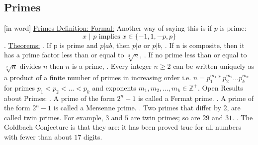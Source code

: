 \documentclass{article}
\begin{document}
\subsection{Primes}
[in word]
\newline
\newline
\underline{Primes Definition: Formal:}
Another way of saying this is if $p$ is prime:
$$x \text{ | } p	\text{ implies }	x \in \{ -1,1,-p,p \}$$.
\newline
\newline
\underline{Theorems:}
\newline
{}. If p is prime and $p | ab$, then $p | a$ or $p | b$,
. If n is composite, then it has a prime factor less than or equal to $\sqrt[2]{n}$,
. If no prime less than or equal to $\sqrt[2]{n}$ divides $n$ then $n$ is a prime,
. Every integer $n \geq 2$ can be written uniquely as a product of a finite number of primes in increasing order i.e. $n = p_1^{m_1} * p_2^{m_2} \dots p_k^{m_k}$
for primes $p_1 < p_2 < \dots < p_k$ and exponents $m_1,m_2, \dots ,m_k \in \mathbb{Z}^+$.
\newline
\newline
Open Results about Primes:
\newline
{}. A prime of the form $2^n + 1$ is called a Fermat prime.
. A prime of the form $2^{n} - 1$ is called a Mersenne prime.
. Two primes that differ by 2, are called twin primes.
For example, $3$ and $5$ are twin primes; so are $29$ and $31$.
. The Goldbach Conjecture is that they are: it has been proved true for all numbers with fewer than about $17$ digits.
\newpage
\end{document}
